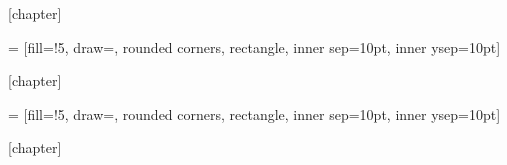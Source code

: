 [chapter]

 = [fill=!5,
draw=,
rounded corners,
rectangle, inner sep=10pt, inner ysep=10pt]

\newcommand{\defn}[2][]
{\stepcounter{defcounter}
	\setlength{\netlength}{\textwidth}
	\addtolength{\netlength}{-20pt}
	
	\bigskip\noindent
	\begin{tikzpicture}
	\node[dboxstyle] (dbox)
	{\begin{minipage}{\netlength}
		\ifthenelse{\equal{#1}{\empty}}{\smallskip}{\medskip}
		#2
		\end{minipage}
	};
	\node[inner ysep=0pt] at (dbox.north west) [anchor=west, xshift=2mm,  fill=white, text=\defcolorfill, top color=white, bottom color=\defcolorfill!5, rounded corners]
	{\textbf{\large Définition \arabic{defcounter}}
		\ifthenelse{\equal{#1}{\empty}}{}{{\large(#1)}}
	};
	\end{tikzpicture}
}

[chapter]

 = [fill=\checkboxfill!5,
draw=\checkboxborder,
rounded corners,
rectangle, inner sep=10pt, inner ysep=10pt]

\newcommand{\addCheckpoint}[3][]
{\stepcounter{checkboxcounter}
	\setlength{\netlength}{\textwidth}
	\addtolength{\netlength}{-20pt}
	
	\bigskip\noindent
	\begin{tikzpicture}
	\node[checkboxstyle] (dbox)
	{\begin{minipage}{\netlength}
		\ifthenelse{\equal{#1}{\empty}}{\smallskip}{\medskip}
		#3
		\end{minipage}
	};
	\node[inner ysep=0pt] at (dbox.north west) [anchor=west, xshift=2mm,  fill=white, text=\checkboxborder, top color=white, bottom color=\checkboxfill!5, rounded corners]
	{\textbf{\large Checkpoint \arabic{checkboxcounter}}
		\large(#2)
	};
	\node[inner ysep=0pt, inner xsep=0pt] at (dbox.south east) [anchor=east, xshift=-2mm,  fill=white, text=\checkboxborder, bottom color=white, top color=\checkboxfill!5, rounded corners]
	{\textbf{
		\ifthenelse{\equal{#1}{\empty}}{}{{\large(#1)}}}
	};
	\end{tikzpicture}
}

[chapter]


